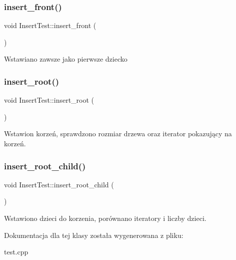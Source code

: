 \subsubsection{\texorpdfstring{insert\+\_\+front()}{insert\_front()}}
{\footnotesize\ttfamily void Insert\+Test\+::insert\+\_\+front (\begin{DoxyParamCaption}{ }\end{DoxyParamCaption})\hspace{0.3cm}{\ttfamily [inline]}}

Wstawiano zawsze jako pierwsze dziecko \mbox{\label{class_insert_test_a08b1a1c6b86e528795c49c20e019d701}} 
\subsubsection{\texorpdfstring{insert\+\_\+root()}{insert\_root()}}
{\footnotesize\ttfamily void Insert\+Test\+::insert\+\_\+root (\begin{DoxyParamCaption}{ }\end{DoxyParamCaption})\hspace{0.3cm}{\ttfamily [inline]}}

Wstawion korzeń, sprawdzono rozmiar drzewa oraz iterator pokazujący na korzeń. \mbox{\label{class_insert_test_a0bab461bf75465f1f23a21a962266389}} 
\subsubsection{\texorpdfstring{insert\+\_\+root\+\_\+child()}{insert\_root\_child()}}
{\footnotesize\ttfamily void Insert\+Test\+::insert\+\_\+root\+\_\+child (\begin{DoxyParamCaption}{ }\end{DoxyParamCaption})\hspace{0.3cm}{\ttfamily [inline]}}

Wstawiono dzieci do korzenia, porównano iteratory i liczby dzieci. 

Dokumentacja dla tej klasy została wygenerowana z pliku\+:\begin{DoxyCompactItemize}
\item 
test.\+cpp\end{DoxyCompactItemize}
